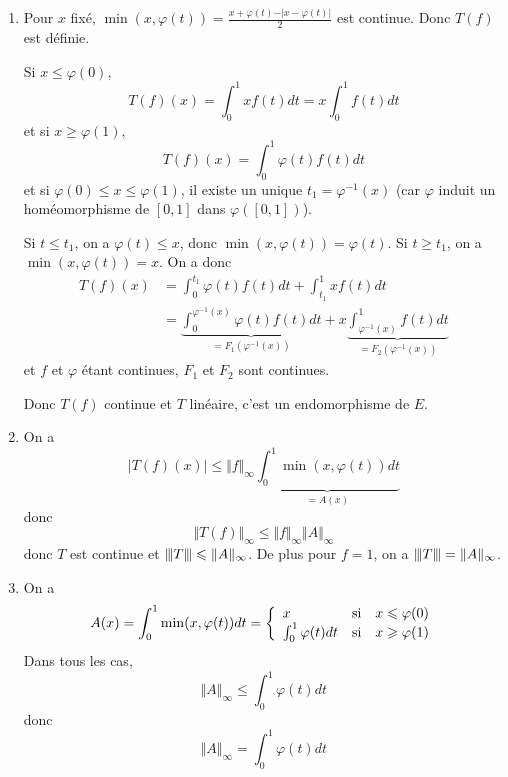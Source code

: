 \begin{solution}
	\phantom{}
	\begin{enumerate}
		\item Pour $x$ fixé, $\min(x,\varphi(t))=\frac{x+\varphi(t)-\vert x-\varphi(t)\vert}{2}$ est continue. Donc $T(f)$ est définie.
		
		Si $x\leqslant\varphi(0)$,
		$$T(f)(x)=\int_{0}^{1}xf(t)dt=x\int_{0}^{1}f(t)dt$$
		et si $x\geqslant\varphi(1)$,
		$$T(f)(x)=\int_{0}^{1}\varphi(t)f(t)dt$$ 
		et si $\varphi(0)\leqslant x\leqslant\varphi(1)$, il existe un unique $t_{1}=\varphi^{-1}(x)$ (car $\varphi$ induit un homéomorphisme de $[0,1]$ dans $\varphi([0,1])$). 
		
		Si $t\leqslant t_{1}$, on a $\varphi(t)\leqslant x$, donc $\min(x,\varphi(t))=\varphi(t)$. Si $t\geqslant t_{1}$, on a $\min(x,\varphi(t))=x$. On a donc 
		\begin{align*}
			T(f)(x)
			&=\int_{0}^{t_{1}}\varphi(t)f(t)dt+\int_{t_{1}}^{1}xf(t)dt\\
			&=\underbrace{\int_{0}^{\varphi^{-1}(x)}\varphi(t)f(t)dt}_{=F_{1}(\varphi^{-1}(x))}+x\underbrace{\int_{\varphi^{-1}(x)}^{1}f(t)dt}_{=F_{2}(\varphi^{-1}(x))}
		\end{align*}
		et $f$ et $\varphi$ étant continues, $F_{1}$ et $F_{2}$ sont continues.

		Donc $T(f)$ continue et $T$ linéaire, c'est un endomorphisme de $E$.

		\item On a 
		\begin{equation*}
			\vert T(f)(x)\vert\leqslant\Vert f\Vert_{\infty}\underbrace{\int_{0}^{1}\min(x,\varphi(t))dt}_{=A(x)}
		\end{equation*}
		donc 
		$$\Vert T(f)\Vert_{\infty}\leqslant\Vert f\Vert_{\infty}\Vert A\Vert_{\infty}$$
		donc $T$ est continue et ${\left\vert\kern-0.25ex\left\vert\kern-0.25ex\left\vert{}T \right\vert\kern-0.25ex\right\vert\kern-0.25ex\right\vert}\leqslant\Vert A\Vert_{\infty}$. De plus pour $f=1$, on a ${\left\vert\kern-0.25ex\left\vert\kern-0.25ex\left\vert{}T \right\vert\kern-0.25ex\right\vert\kern-0.25ex\right\vert}=\Vert A\Vert_{\infty}$.

		\item On a 
		$$
		A(x)=\int_{0}^{1}\min(x,\varphi(t))dt=
		\left\{
			\begin{array}[]{lll}
				x & \text{si} & x\leqslant\varphi(0)\\
				\int_{0}^{1}\varphi(t)dt & \text{si} & x\geqslant\varphi(1)
			\end{array}
		\right.
		$$
		Dans tous les cas, 
		$$\Vert A\Vert_{\infty}\leqslant\int_{0}^{1}\varphi(t)dt$$
		donc 
		$$\Vert A\Vert_{\infty}=\int_{0}^{1}\varphi(t)dt$$
	\end{enumerate}
\end{solution}

